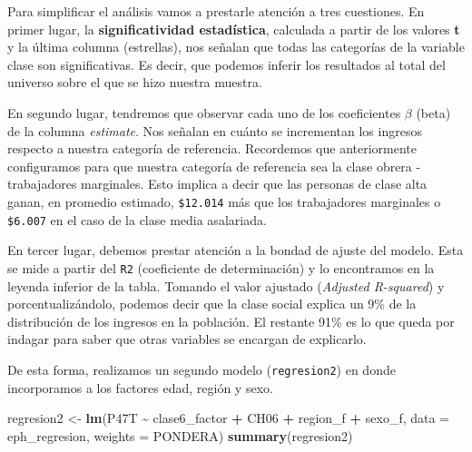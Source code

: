 \documentclass[
]{article}
\newenvironment{Shaded}{\begin{snugshade}}{\end{snugshade}}
\newcommand{\AttributeTok}[1]{\textcolor[rgb]{0.13,0.29,0.53}{#1}}
\newcommand{\FunctionTok}[1]{\textcolor[rgb]{0.13,0.29,0.53}{\textbf{#1}}}
\newcommand{\NormalTok}[1]{#1}
\newcommand{\OtherTok}[1]{\textcolor[rgb]{0.56,0.35,0.01}{#1}}
\newcommand{\SpecialCharTok}[1]{\textcolor[rgb]{0.81,0.36,0.00}{\textbf{#1}}}
\begin{document}
Para simplificar el análisis vamos a prestarle atención a tres cuestiones. En primer lugar, la \textbf{significatividad estadística}, calculada a partir de los valores \textbf{t} y la última columna (estrellas), nos señalan que todas las categorías de la variable clase son significativas. Es decir, que podemos inferir los resultados al total del universo sobre el que se hizo nuestra muestra.

En segundo lugar, tendremos que observar cada uno de los coeficientes \(\beta\) (beta) de la columna \emph{estimate}. Nos señalan en cuánto se incrementan los ingresos respecto a nuestra categoría de referencia. Recordemos que anteriormente configuramos para que nuestra categoría de referencia sea la clase obrera - trabajadores marginales. Esto implica a decir que las personas de clase alta ganan, en promedio estimado, \texttt{\$12.014} más que los trabajadores marginales o \texttt{\$6.007} en el caso de la clase media asalariada.

En tercer lugar, debemos prestar atención a la bondad de ajuste del modelo. Esta se mide a partir del \texttt{R2} (coeficiente de determinación) y lo encontramos en la leyenda inferior de la tabla. Tomando el valor ajustado (\emph{Adjusted R-squared}) y porcentualizándolo, podemos decir que la clase social explica un 9\% de la distribución de los ingresos en la población. El restante 91\% es lo que queda por indagar para saber que otras variables se encargan de explicarlo.

De esta forma, realizamos un segundo modelo (\texttt{regresion2}) en donde incorporamos a los factores edad, región y sexo.

\begin{Shaded}
\begin{Highlighting}[]
\NormalTok{regresion2 }\OtherTok{\textless{}{-}} \FunctionTok{lm}\NormalTok{(P47T }\SpecialCharTok{\textasciitilde{}}\NormalTok{ clase6\_factor }\SpecialCharTok{+}\NormalTok{ CH06 }\SpecialCharTok{+}\NormalTok{ region\_f }\SpecialCharTok{+}\NormalTok{ sexo\_f, }\AttributeTok{data =}\NormalTok{ eph\_regresion,}
    \AttributeTok{weights =}\NormalTok{ PONDERA)}
\FunctionTok{summary}\NormalTok{(regresion2)}
\end{Highlighting}
\end{Shaded}
\end{document}
